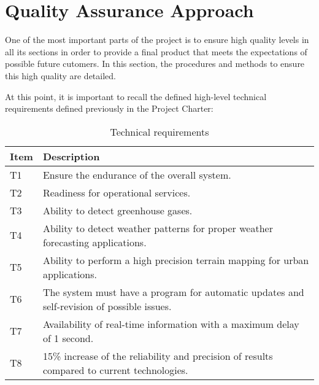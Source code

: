 \section{Quality Assurance Approach}
One of the most important parts of the project is to ensure high quality levels in all its sections in order to provide a final product that meets the expectations of possible future cutomers. In this section, the procedures and methods to ensure this high quality are detailed. 

At this point, it is important to recall the defined high-level technical requirements defined previously in the Project Charter:
\begin{table}[H]
	\centering
	\begin{tabular}{l p{13.3cm}}
		
		\toprule[2pt]
		
		\textbf{Item} &  \textbf{Description}\\
		
		\midrule [1.5pt]
		
		T1 & Ensure the endurance of the overall system.\vspace{0.2cm}\\
		
		\midrule
		
		T2 & Readiness for operational services.\vspace{0.2cm}\\
		
		\midrule
		
		T3 & Ability to detect greenhouse gases.\vspace{0.2cm}\\
		
		\midrule
		
		T4 & Ability to detect weather patterns for proper weather forecasting applications.\vspace{0.2cm}\\
		
		\midrule
		
		T5 & Ability to perform a high precision terrain mapping for urban applications.\vspace{0.2cm}\\
		
		\midrule
		
		T6 & The system must have a program for automatic updates and self-revision of possible issues.\vspace{0.2cm}\\
		
		\midrule
		
		T7 & Availability of real-time information with a maximum delay of 1 second.\vspace{0.2cm}\\
		
		\midrule
		
		T8 & 15\% increase of the reliability and precision of results compared to current technologies.\vspace{0.2cm}\\
		
		\bottomrule[2pt]
		
	\end{tabular}
	\caption{Technical requirements}
\end{table}

